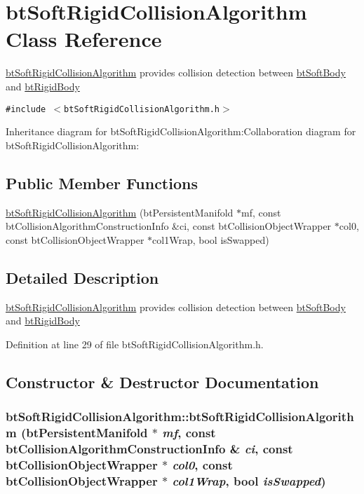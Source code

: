 \hypertarget{classbt_soft_rigid_collision_algorithm}{
\section{btSoftRigidCollisionAlgorithm Class Reference}
\label{classbt_soft_rigid_collision_algorithm}
}
\hyperlink{classbt_soft_rigid_collision_algorithm}{btSoftRigidCollisionAlgorithm} provides collision detection between \hyperlink{classbt_soft_body}{btSoftBody} and \hyperlink{classbt_rigid_body}{btRigidBody}  


{\tt \#include $<$btSoftRigidCollisionAlgorithm.h$>$}

Inheritance diagram for btSoftRigidCollisionAlgorithm:Collaboration diagram for btSoftRigidCollisionAlgorithm:\subsection*{Public Member Functions}
\begin{CompactItemize}
\item 
\hyperlink{classbt_soft_rigid_collision_algorithm_a6f289e315d626acf0a47ba093f6d4eb}{btSoftRigidCollisionAlgorithm} (btPersistentManifold $\ast$mf, const btCollisionAlgorithmConstructionInfo \&ci, const btCollisionObjectWrapper $\ast$col0, const btCollisionObjectWrapper $\ast$col1Wrap, bool isSwapped)
\end{CompactItemize}


\subsection{Detailed Description}
\hyperlink{classbt_soft_rigid_collision_algorithm}{btSoftRigidCollisionAlgorithm} provides collision detection between \hyperlink{classbt_soft_body}{btSoftBody} and \hyperlink{classbt_rigid_body}{btRigidBody} 

Definition at line 29 of file btSoftRigidCollisionAlgorithm.h.

\subsection{Constructor \& Destructor Documentation}
\hypertarget{classbt_soft_rigid_collision_algorithm_a6f289e315d626acf0a47ba093f6d4eb}{
\subsubsection[btSoftRigidCollisionAlgorithm]{\setlength{\rightskip}{0pt plus 5cm}btSoftRigidCollisionAlgorithm::btSoftRigidCollisionAlgorithm (btPersistentManifold $\ast$ {\em mf}, \/  const btCollisionAlgorithmConstructionInfo \& {\em ci}, \/  const btCollisionObjectWrapper $\ast$ {\em col0}, \/  const btCollisionObjectWrapper $\ast$ {\em col1Wrap}, \/  bool {\em isSwapped})}}
\label{classbt_soft_rigid_collision_algorithm_a6f289e315d626acf0a47ba093f6d4eb}


